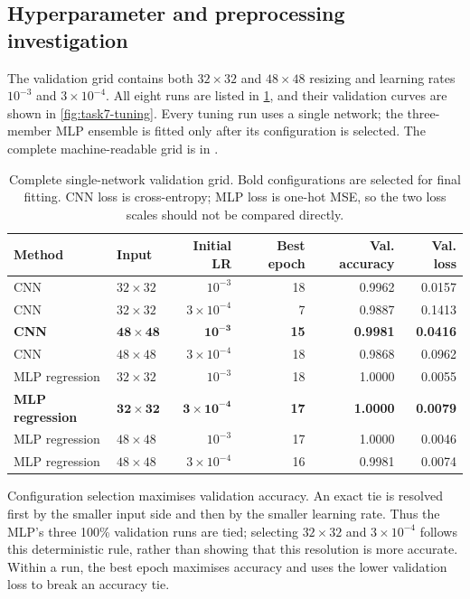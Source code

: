 \subsection{Hyperparameter and preprocessing investigation}

The validation grid contains both $32\times32$ and $48\times48$ resizing and
learning rates $10^{-3}$ and $3\times10^{-4}$.  All eight runs are listed in
\cref{tab:task7-tuning}, and their validation curves are shown in
\cref{fig:task7-tuning}.  Every tuning run uses a single network; the three-member
MLP ensemble is fitted only after its configuration is selected.  The complete
machine-readable grid is in .

\begin{table}[!htbp]
  \centering
  \caption{Complete single-network validation grid. Bold configurations are
  selected for final fitting. CNN loss is cross-entropy; MLP loss is one-hot
  MSE, so the two loss scales should not be compared directly.}
  \label{tab:task7-tuning}
  \setlength{\tabcolsep}{5pt}
  \begin{tabular}{llrrrr}
    \toprule
    Method & Input & Initial LR & Best epoch & Val. accuracy & Val. loss \\
    \midrule
    CNN & $32\times32$ & $10^{-3}$ & 18 & 0.9962 & 0.0157 \\
    CNN & $32\times32$ & $3\times10^{-4}$ & 7 & 0.9887 & 0.1413 \\
    \textbf{CNN} & $\mathbf{48\times48}$ & $\mathbf{10^{-3}}$ & \textbf{15} & \textbf{0.9981} & \textbf{0.0416} \\
    CNN & $48\times48$ & $3\times10^{-4}$ & 18 & 0.9868 & 0.0962 \\
    \midrule
    MLP regression & $32\times32$ & $10^{-3}$ & 18 & 1.0000 & 0.0055 \\
    \textbf{MLP regression} & $\mathbf{32\times32}$ & $\mathbf{3\times10^{-4}}$ & \textbf{17} & \textbf{1.0000} & \textbf{0.0079} \\
    MLP regression & $48\times48$ & $10^{-3}$ & 17 & 1.0000 & 0.0046 \\
    MLP regression & $48\times48$ & $3\times10^{-4}$ & 16 & 0.9981 & 0.0074 \\
    \bottomrule
  \end{tabular}
\end{table}

Configuration selection maximises validation accuracy.  An exact tie is
resolved first by the smaller input side and then by the smaller learning
rate.  Thus the MLP's three 100\% validation runs are tied; selecting
$32\times32$ and $3\times10^{-4}$ follows this deterministic rule, rather than
showing that this resolution is more accurate.  Within a run, the best epoch
maximises accuracy and uses the lower validation loss to break an accuracy tie.


